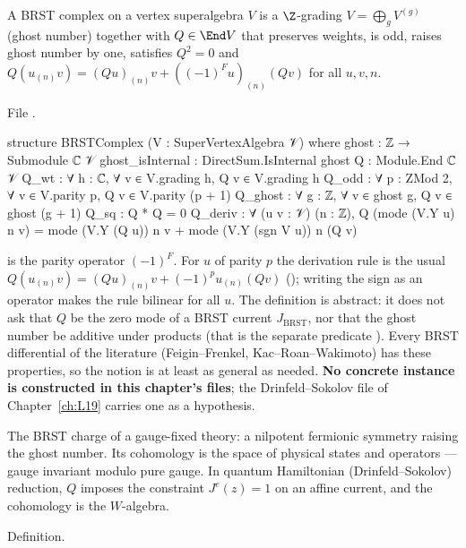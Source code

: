 \begin{definition}\label{l04:def:brst}
A BRST complex on a vertex superalgebra $V$ is a $\Z$-grading $V = \bigoplus_gV^{(g)}$ (ghost number)
together with $Q\in\End V$ that preserves weights, is odd, raises ghost number by one, satisfies
$Q^2 = 0$ and $Q(u_{(n)}v) = (Qu)_{(n)}v + ((-1)^Fu)_{(n)}(Qv)$ for all $u,v,n$.
\end{definition}
\noindent File .
\begin{leancode}
structure BRSTComplex (V : SuperVertexAlgebra 𝒱) where
  ghost : ℤ → Submodule ℂ 𝒱
  ghost_isInternal : DirectSum.IsInternal ghost
  Q : Module.End ℂ 𝒱
  Q_wt : ∀ h : ℂ, ∀ v ∈ V.grading h, Q v ∈ V.grading h
  Q_odd : ∀ p : ZMod 2, ∀ v ∈ V.parity p, Q v ∈ V.parity (p + 1)
  Q_ghost : ∀ g : ℤ, ∀ v ∈ ghost g, Q v ∈ ghost (g + 1)
  Q_sq : Q * Q = 0
  Q_deriv : ∀ (u v : 𝒱) (n : ℤ),
    Q (mode (V.Y u) n v) = mode (V.Y (Q u)) n v + mode (V.Y (sgn V u)) n (Q v)
\end{leancode}
\begin{dictionary}
 is the parity operator $(-1)^F$. For $u$ of parity $p$ the derivation rule is the usual
$Q(u_{(n)}v) = (Qu)_{(n)}v + (-1)^pu_{(n)}(Qv)$ (); writing the sign as an operator
makes the rule bilinear for all $u$. The definition is abstract: it does not ask that $Q$ be the zero
mode of a BRST current $J_{\mathrm{BRST}}$, nor that the ghost number be additive under products
(that is the separate predicate ). Every BRST differential of the literature
(Feigin--Frenkel, Kac--Roan--Wakimoto) has these properties, so the notion is at least as general as
needed. \textbf{No concrete instance is constructed in this chapter's files}; the Drinfeld--Sokolov
file of Chapter~\ref{ch:L19} carries one as a hypothesis.
\end{dictionary}
\begin{physics}
The BRST charge of a gauge-fixed theory: a nilpotent fermionic symmetry raising the ghost number. Its
cohomology is the space of physical states and operators --- gauge invariant modulo pure gauge. In
quantum Hamiltonian (Drinfeld--Sokolov) reduction, $Q$ imposes the constraint $J^{e}(z) = 1$ on an affine
current, and the cohomology is the $W$-algebra.
\end{physics}
\begin{status}
Definition.
\end{status}


